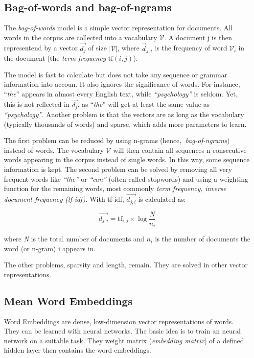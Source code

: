 \subsection{Bag-of-words and bag-of-ngrams}
The \emph{bag-of-words} model is a simple vector representation for documents. All words in the corpus are collected into a vocabulary $\mathcal{V}$. A document j is then representend by a vector $\vec{d_j}$ of size $|\mathcal{V}|$, where $\vec{d}_{j,i}$ is the frequency of word $\mathcal{V}_i$ in the document (the \emph{term frequency} $\text{tf}(i,j)$).

The model is fast to calculate but does not take any sequence or grammar information into accoun. It also ignores the significance of words. For instance, \enquote{\emph{the}} appears in almost every English text, while \emph{\enquote{psychology}} is seldom. Yet, this is not reflected in $\vec{d_j}$, as \enquote{\emph{the}} will get at least the same value as \emph{\enquote{psychology}}. Another problem is that the vectors are as long as the vocabulary (typically thousands of words) and sparse, which adds more parameters to learn.

The first problem can be reduced by using n-grams (hence, \emph{bag-of-ngrams}) instead of words. The vocabulary $\mathcal{V}$ will then contain all sequences n consecutive words appearing in the corpus instead of single words. In this way, some sequence information is kept. The second problem can be solved by removing all very frequent words like \emph{\enquote{the}} or \emph{\enquote{can}} (often called stopwords) and using a weighting function for the remaining words, most commonly \emph{term frequency, inverse document-frequency (tf-idf)}. With tf-idf, $\vec{d_{j,i}}$ is calculated as:

\[\vec{d_{j,i}} = \text{tf}_{i,j} \times \log{ \frac{N}{n_i} } \]

where \emph{N} is the total number of documents and $n_i$ is the number of documents the word (or n-gram) i appears in.

The other problems, sparsity and length, remain. They are solved in other vector representations.


\subsection{Mean Word Embeddings}
Word Embeddings are dense, low-dimension vector representations of words. They can be learned with neural networks. The basic idea is to train an neural network on a suitable task. They weight matrix (\emph{embedding matrix}) of a defined hidden layer then contains the word embeddings.

